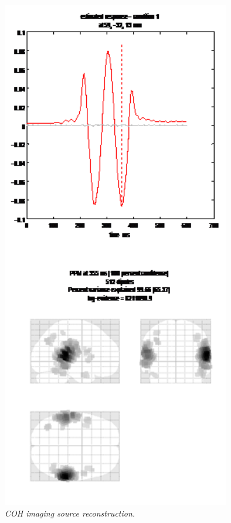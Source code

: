 \begin{figure}
\begin{center}
\includegraphics[width=100mm]{meg_sloc/slide5}
\caption{\em COH imaging source reconstruction.\label{meg_sloc:fig:5}}
\end{center}
\end{figure}

